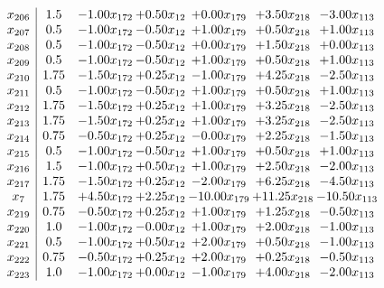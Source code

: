 \documentclass[8pt]{article}
\begin{document}
\[\begin{array}{c| c c@{\hskip 2pt} c@{\hskip 2pt} c@{\hskip 2pt} c@{\hskip 2pt} c@{\hskip 2pt} }
 x_{206}   &  1.5 & -1.00 x_{172} & +  0.50 x_{12} & +  0.00 x_{179} & +  3.50 x_{218} & -3.00 x_{113}\\
 x_{207}   &  0.5 & -1.00 x_{172} & -0.50 x_{12} & +  1.00 x_{179} & +  0.50 x_{218} & +  1.00 x_{113}\\
 x_{208}   &  0.5 & -1.00 x_{172} & -0.50 x_{12} & +  0.00 x_{179} & +  1.50 x_{218} & +  0.00 x_{113}\\
 x_{209}   &  0.5 & -1.00 x_{172} & -0.50 x_{12} & +  1.00 x_{179} & +  0.50 x_{218} & +  1.00 x_{113}\\
 x_{210}   &  1.75 & -1.50 x_{172} & +  0.25 x_{12} & -1.00 x_{179} & +  4.25 x_{218} & -2.50 x_{113}\\
 x_{211}   &  0.5 & -1.00 x_{172} & -0.50 x_{12} & +  1.00 x_{179} & +  0.50 x_{218} & +  1.00 x_{113}\\
 x_{212}   &  1.75 & -1.50 x_{172} & +  0.25 x_{12} & +  1.00 x_{179} & +  3.25 x_{218} & -2.50 x_{113}\\
 x_{213}   &  1.75 & -1.50 x_{172} & +  0.25 x_{12} & +  1.00 x_{179} & +  3.25 x_{218} & -2.50 x_{113}\\
 x_{214}   &  0.75 & -0.50 x_{172} & +  0.25 x_{12} & -0.00 x_{179} & +  2.25 x_{218} & -1.50 x_{113}\\
 x_{215}   &  0.5 & -1.00 x_{172} & -0.50 x_{12} & +  1.00 x_{179} & +  0.50 x_{218} & +  1.00 x_{113}\\
 x_{216}   &  1.5 & -1.00 x_{172} & +  0.50 x_{12} & +  1.00 x_{179} & +  2.50 x_{218} & -2.00 x_{113}\\
 x_{217}   &  1.75 & -1.50 x_{172} & +  0.25 x_{12} & -2.00 x_{179} & +  6.25 x_{218} & -4.50 x_{113}\\
 x_{7}   &  1.75 & +  4.50 x_{172} & +  2.25 x_{12} & -10.00 x_{179} & + 11.25 x_{218} & -10.50 x_{113}\\
 x_{219}   &  0.75 & -0.50 x_{172} & +  0.25 x_{12} & +  1.00 x_{179} & +  1.25 x_{218} & -0.50 x_{113}\\
 x_{220}   &  1.0 & -1.00 x_{172} & -0.00 x_{12} & +  1.00 x_{179} & +  2.00 x_{218} & -1.00 x_{113}\\
 x_{221}   &  0.5 & -1.00 x_{172} & +  0.50 x_{12} & +  2.00 x_{179} & +  0.50 x_{218} & -1.00 x_{113}\\
 x_{222}   &  0.75 & -0.50 x_{172} & +  0.25 x_{12} & +  2.00 x_{179} & +  0.25 x_{218} & -0.50 x_{113}\\
 x_{223}   &  1.0 & -1.00 x_{172} & +  0.00 x_{12} & -1.00 x_{179} & +  4.00 x_{218} & -2.00 x_{113}\\

\end{array}\]
\end{document}
